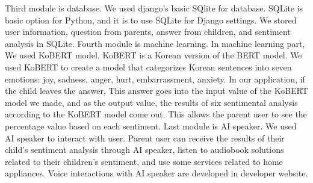 \documentclass[conference]{IEEEtran}
\begin{document}
Third  module is database. We used django’s basic SQlite for database. SQLite is basic option for Python, and it is to use SQLite for Django settings. We stored user information, question from parents, answer from children, and sentiment analysis in SQLite. Fourth module is machine learning. In machine learning part, We used KoBERT model. KoBERT is a Korean version of the BERT model. We used KoBERT to create a model that categorizes Korean sentences into seven emotions: joy, sadness, anger, hurt, embarrassment, anxiety. In our application, if the child leaves the answer, This answer goes into the input value of the KoBERT model we made, and as the output value, the results of six sentimental analysis according to the KoBERT model come out. This allows the parent user to see the percentage value based on each sentiment. Last module is AI speaker. We used AI speaker to interact with user. Parent user can receive the results of their child's sentiment analysis through AI speaker, listen to audiobook solutions related to their children's sentiment, and use some services related to home appliances. Voice interactions with AI speaker are developed in developer website.
\vspace{0.5cm}
\end{document}
